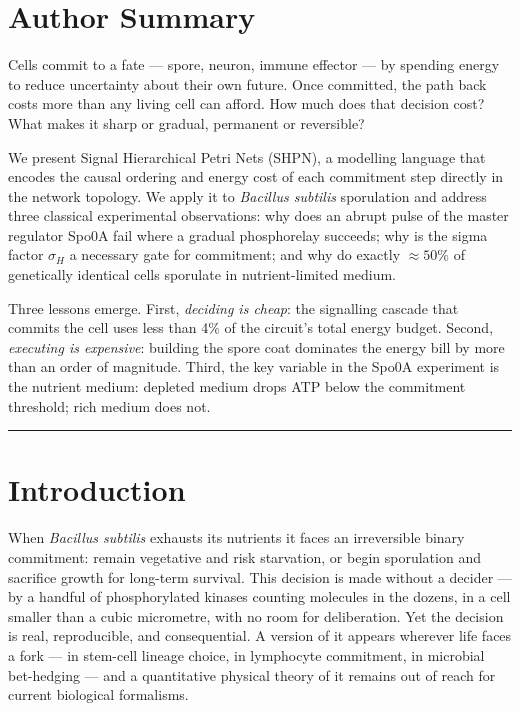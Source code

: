 \documentclass[11pt,a4paper]{article}
\begin{document}
\bigskip

\section*{Author Summary}

\noindent
Cells commit to a fate --- spore, neuron, immune effector --- by spending energy
to reduce uncertainty about their own future.  Once committed, the path back costs
more than any living cell can afford.  How much does that decision cost?  What
makes it sharp or gradual, permanent or reversible?

We present Signal Hierarchical Petri Nets (SHPN), a modelling language that
encodes the causal ordering and energy cost of each commitment step directly in
the network topology.  We apply it to \textit{Bacillus subtilis} sporulation
and address three classical experimental observations: why does an abrupt pulse
of the master regulator Spo0A fail where a gradual phosphorelay succeeds;
why is the sigma factor $\sigma_H$ a necessary gate for commitment;
and why do exactly $\approx 50\%$ of genetically identical cells sporulate
in nutrient-limited medium.

Three lessons emerge.  First, \emph{deciding is cheap}: the signalling
cascade that commits the cell uses less than 4\% of the circuit's total
energy budget.  Second, \emph{executing is expensive}: building the spore
coat dominates the energy bill by more than an order of magnitude.
Third, the key variable in the Spo0A experiment is the nutrient medium:
depleted medium drops ATP below the commitment threshold; rich medium does not.

\bigskip
\hrule
\bigskip

\section{Introduction}
\label{sec:intro}

When \textit{Bacillus subtilis} exhausts its nutrients it faces an
irreversible binary commitment: remain vegetative and risk starvation,
or begin sporulation and sacrifice growth for long-term survival.
This decision is made without a decider — by a handful of
phosphorylated kinases counting molecules in the dozens, in a cell
smaller than a cubic micrometre, with no room for deliberation.
Yet the decision is real, reproducible, and consequential.
A version of it appears wherever life faces a fork — in stem-cell
lineage choice, in lymphocyte commitment, in microbial bet-hedging —
and a quantitative physical theory of it remains out of reach for current biological formalisms.
\end{document}
